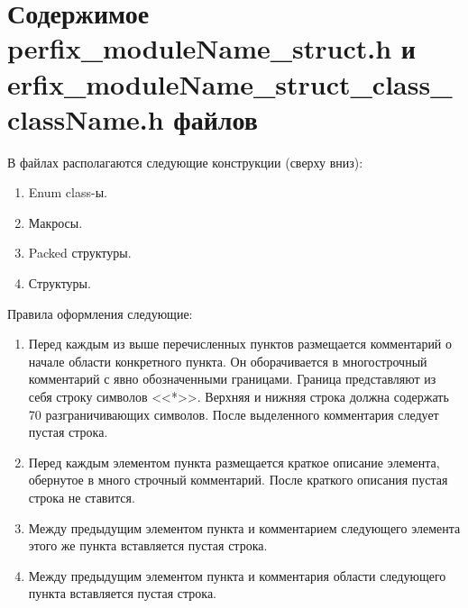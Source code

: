 \section{Содержимое perfix\_moduleName\_struct.h и\\erfix\_moduleName\_struct\_class\_className.h файлов}\label{p:struc:h}
В файлах располагаются следующие конструкции (сверху вниз):
\begin{enumerate}
	\item Enum class-ы.
	\item Макросы.
	\item Packed структуры.
	\item Структуры.
\end{enumerate}
Правила оформления следующие:
\begin{enumerate}
	\item Перед каждым из выше перечисленных пунктов размещается комментарий о начале области конкретного пункта. Он оборачивается в многострочный комментарий с явно обозначенными границами. Граница представляют из себя строку символов <<*>>. Верхняя и нижняя строка должна содержать 70 разграничивающих символов. После выделенного комментария следует пустая строка.
	\item Перед каждым элементом пункта размещается краткое описание элемента, обернутое в много строчный комментарий. После краткого описания пустая строка не ставится.
	\item Между предыдущим элементом пункта и комментарием следующего элемента этого же пункта вставляется пустая строка.
	\item Между предыдущим элементом пункта и комментария области следующего пункта вставляется пустая строка.
\end{enumerate}
